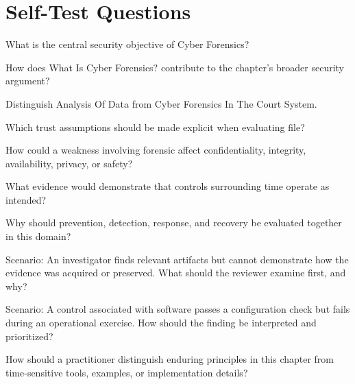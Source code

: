 \documentclass[11pt,letterpaper]{article}
\begin{document}
\section*{Self-Test Questions}
\begin{CornellRecallList}
\item What is the central security objective of Cyber Forensics?
\item How does What Is Cyber Forensics? contribute to the chapter's broader security argument?
\item Distinguish Analysis Of Data from Cyber Forensics In The Court System.
\item Which trust assumptions should be made explicit when evaluating file?
\item How could a weakness involving forensic affect confidentiality, integrity, availability, privacy, or safety?
\item What evidence would demonstrate that controls surrounding time operate as intended?
\item Why should prevention, detection, response, and recovery be evaluated together in this domain?
\item Scenario: An investigator finds relevant artifacts but cannot demonstrate how the evidence was acquired or preserved. What should the reviewer examine first, and why?
\item Scenario: A control associated with software passes a configuration check but fails during an operational exercise. How should the finding be interpreted and prioritized?
\item How should a practitioner distinguish enduring principles in this chapter from time-sensitive tools, examples, or implementation details?
\end{CornellRecallList}
\end{document}
